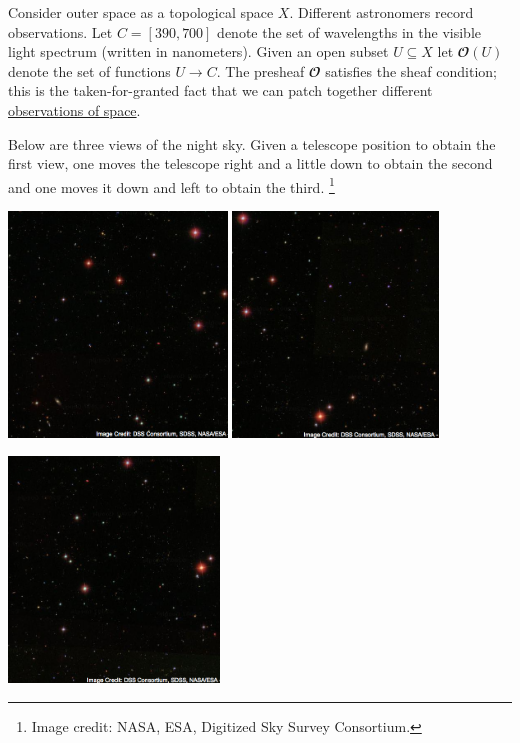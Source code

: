 \documentclass[../main/CT4S-EN-RU]{subfiles}
\begin{document}
\begin{applicationENG}
Consider outer space as a topological space $X.$ Different astronomers record observations. Let $C=[390,700]$ denote the set of wavelengths in the visible light spectrum (written in nanometers). Given an open subset $U\subseteq X$ let ${𝓞}(U)$ denote the set of functions $U{→} C.$ The presheaf ${𝓞}$ satisfies the sheaf condition; this is the taken-for-granted fact that we can patch together different \href{http://en.wikipedia.org/wiki/Astrophotography}{\text observations of space}.

Below are three views of the night sky. Given a telescope position to obtain the first view, one moves the telescope right and a little down to obtain the second and one moves it down and left to obtain the third.
\footnote{Image credit: NASA, ESA, Digitized Sky Survey Consortium.}
\begin{center}\parbox{5.5in}{\begin{center}
\includegraphics[height=6cm]{Sky1}\hsp
\includegraphics[height=6cm]{Sky2}\end{center}
\hspace{1.8in}
\includegraphics[height=6cm]{Sky3}}\end{center}

\end{applicationENG}
\end{document}
